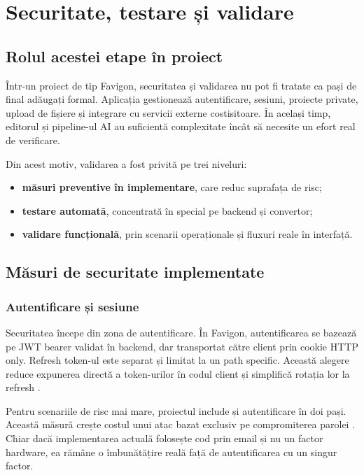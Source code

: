 \chapter{Securitate, testare și validare}

\section{Rolul acestei etape în proiect}

Într-un proiect de tip Favigon, securitatea și validarea nu pot fi tratate ca pași de final adăugați formal. Aplicația gestionează autentificare, sesiuni, proiecte private, upload de fișiere și integrare cu servicii externe costisitoare. În același timp, editorul și pipeline-ul AI au suficientă complexitate încât să necesite un efort real de verificare.

Din acest motiv, validarea a fost privită pe trei niveluri:

\begin{itemize}[leftmargin=1.5cm]
  \item \textbf{măsuri preventive în implementare}, care reduc suprafața de risc;
  \item \textbf{testare automată}, concentrată în special pe backend și convertor;
  \item \textbf{validare funcțională}, prin scenarii operaționale și fluxuri reale în interfață.
\end{itemize}

\section{Măsuri de securitate implementate}

\subsection{Autentificare și sesiune}

Securitatea începe din zona de autentificare. În Favigon, autentificarea se bazează pe JWT bearer validat în backend, dar transportat către client prin cookie HTTP only. Refresh token-ul este separat și limitat la un path specific. Această alegere reduce expunerea directă a token-urilor în codul client și simplifică rotația lor la refresh \cite{aspnetJwt2025,owaspAuth2026}.

Pentru scenariile de risc mai mare, proiectul include și autentificare în doi pași. Această măsură crește costul unui atac bazat exclusiv pe compromiterea parolei \cite{owaspMfa2026}. Chiar dacă implementarea actuală folosește cod prin email și nu un factor hardware, ea rămâne o îmbunătățire reală față de autentificarea cu un singur factor.


